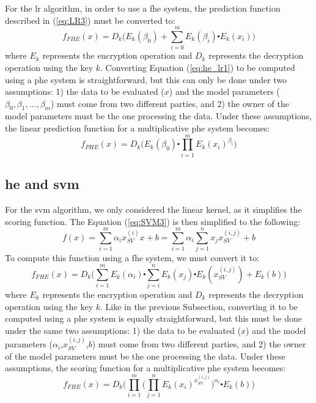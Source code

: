 For the \ac{lr} algorithm, in order to use a \ac{fhe} system, the prediction function described in (\ref{eq:LR3}) must be converted to:
\begin{equation}
\label{eq:he_lr1}
f_{FHE}(x) = D_k \Bigg( E_k(\beta_0) + \sum_{i=0}^m E_k(\beta_i) \centerdot E_k(x_i) \Bigg)
\end{equation}
where $E_k$ represents the encryption operation and $D_k$ represents the decryption operation using the key $k$.
Converting Equation (\ref{eq:he_lr1}) to be computed using a \ac{phe} system is straightforward, but this can only be done under two assumptions: 1) the data to be evaluated ($x$) and the model parameters ($\beta_0,\beta_1,\ldots,\beta_m$) must come from two different parties, and 2) the owner of the model parameters must be the one processing the data. Under these assumptions, the linear prediction function for a multiplicative \ac{phe} system becomes:
\begin{equation}
\label{eq:he_lr2}
f_{PHE}(x) = D_k \Bigg(E_k(\beta_0) \centerdot \prod_{i=1}^m E_k(x_i)^{\beta_i}         \Bigg)
\end{equation}


\subsection{\acl{he} and \acl{svm}}
\label{ssec:HEandSVM}

For the \ac{svm} algorithm, we only considered the linear kernel, as it simplifies the scoring function. The Equation (\ref{eq:SVM3}) is then simplified to the following:
\begin{equation}
\label{eq:he_svm1}
f(x)=\sum_{i=1}^m \alpha_i x_{SV}^{(i)}x+b = \sum_{i=1}^m \alpha_i \sum_{j=1}^n x_j x_{SV}^{(i,j)} + b
\end{equation}
To compute this function using a \ac{fhe} system, we must convert it to:
\begin{equation}
\label{eq:he_svm2}
f_{FHE}(x) = D_k\Bigg( \sum_{i=1}^m E_k(\alpha_i) \centerdot \sum_{j=i}^n E_k(x_j) \centerdot E_k(x_{SV}^{(i,j)}) + E_k(b)\Bigg)
\end{equation}
where $E_k$ represents the encryption operation and $D_k$ represents the decryption operation using the key $k$.
Like in the previous Subsection, converting it to be computed using a \ac{phe} system is equally straightforward, but this must be done under the same two assumptions: 1) the data to be evaluated ($x$) and the model parameters ($\alpha_i$,$x_{SV}^{(i,j)}$,$b$) must come from two different parties, and 2) the owner of the model parameters must be the one processing the data. Under these assumptions, the scoring function for a multiplicative \ac{phe} system becomes:
\begin{equation}
\label{eq:he_svm3}
f_{FHE}(x) = D_k\Bigg( \prod_{i=1}^m \bigg(\prod_{j=1}^n E_k(x_i)^{x_{SV}^{(i,j)}} \bigg)^{\alpha_i} \centerdot E_k(b) \Bigg)
\end{equation}